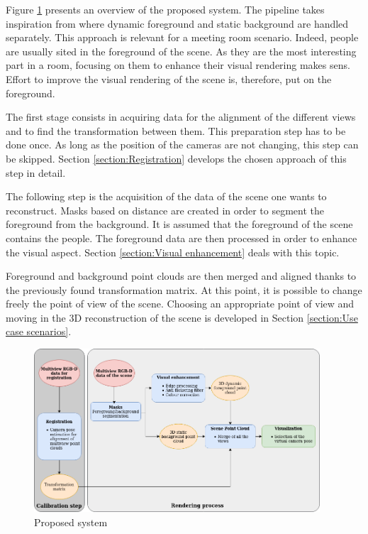 
Figure \ref{figure:proposed_pipeline} presents an overview of the proposed system. The pipeline takes inspiration from \cite{pages_affordable_2018} where dynamic foreground and static background are handled separately. This approach is relevant for a meeting room scenario. Indeed, people are usually sited in the foreground of the scene. As they are the most interesting part in a room, focusing on them to enhance their visual rendering makes sens. Effort to improve the visual rendering of the scene is, therefore, put on the foreground.

The first stage consists in acquiring data for the alignment of the different views and to find the transformation between them. This preparation step has to be done once. As long as the position of the cameras are not changing, this step can be skipped. Section \ref{section:Registration} develops the chosen approach of this step in detail.

The following step is the acquisition of the data of the scene one wants to reconstruct. Masks based on distance are created in order to segment the foreground from the background. It is assumed that the foreground of the scene contains the people. The foreground data are then processed in order to enhance the visual aspect. Section \ref{section:Visual enhancement} deals with this topic.

Foreground and background point clouds are then merged and aligned thanks to the previously found transformation matrix. At this point, it is possible to change freely the point of view of the scene. Choosing an appropriate point of view and moving in the 3D reconstruction of the scene is developed in Section \ref{section:Use case scenarios}.
\newline


% 

\begin{figure}[H]
    \centering
    \includegraphics[width=0.95\textwidth]{images/proposed_pipeline_v3.png}
    \caption{Proposed system}
    \label{figure:proposed_pipeline}
\end{figure}